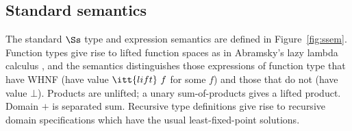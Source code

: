 \subsection{Standard semantics}

The standard $\Ss$ type and expression semantics are defined in
Figure~\ref{fig:ssem}.  Function types give rise to lifted function
spaces as in Abramsky's lazy lambda calculus \cite{Abr89}, and the
semantics distinguishes those expressions of function type that have
WHNF (have value $\itt{lift}~f$ for some $f$) and those that do not (have
value $\bot$).  Products are unlifted; a unary sum-of-products gives a
lifted product.  Domain $\plus$ is separated sum.  Recursive type
definitions give rise to recursive domain specifications which have the
usual least-fixed-point solutions.



